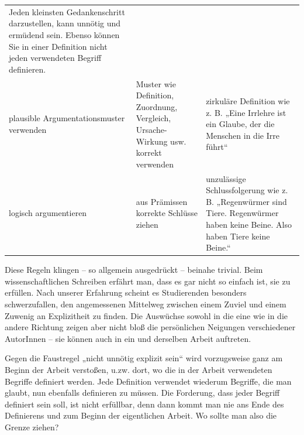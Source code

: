 \documentclass[]{book}
\theoremstyle{definition}
\theoremstyle{definition}
\theoremstyle{definition}
\theoremstyle{remark}
\begin{document}
\begin{longtable}[]{@{}lll@{}}
\begin{minipage}[t]{0.33\columnwidth}
Jeden kleinsten Gedankenschritt darzustellen, kann unnötig und ermüdend
sein. Ebenso können Sie in einer Definition nicht jeden verwendeten
Begriff definieren. \vspace{-6mm}\strut
\end{minipage}\tabularnewline
\begin{minipage}[t]{0.19\columnwidth}\raggedright\strut
plausible Argumentationsmuster verwenden\strut
\end{minipage} & \begin{minipage}[t]{0.39\columnwidth}\raggedright\strut
Muster wie Definition, Zuordnung, Vergleich, Ursache-Wirkung usw.
korrekt verwenden\strut
\end{minipage} & \begin{minipage}[t]{0.33\columnwidth}\raggedright\strut
zirkuläre Definition wie z. B. „Eine Irrlehre ist ein Glaube, der die
Menschen in die Irre führt`` \vspace{-6mm}\strut
\end{minipage}\tabularnewline
\begin{minipage}[t]{0.19\columnwidth}\raggedright\strut
logisch argumentieren\strut
\end{minipage} & \begin{minipage}[t]{0.39\columnwidth}\raggedright\strut
aus Prämissen korrekte Schlüsse ziehen\strut
\end{minipage} & \begin{minipage}[t]{0.33\columnwidth}\raggedright\strut
unzulässige Schlussfolgerung wie z. B. „Regenwürmer sind Tiere.
Regenwürmer haben keine Beine. Also haben Tiere keine Beine.``
\vspace{-6mm}\strut
\end{minipage}\tabularnewline
\bottomrule
\end{longtable}

Diese Regeln klingen -- so allgemein ausgedrückt -- beinahe trivial.
Beim wissenschaftlichen Schreiben erfährt man, dass es gar nicht so
einfach ist, sie zu erfüllen. Nach unserer Erfahrung scheint es
Studierenden besonders schwerzufallen, den angemessenen Mittelweg
zwischen einem Zuviel und einem Zuwenig an Explizitheit zu finden. Die
Auswüchse sowohl in die eine wie in die andere Richtung zeigen aber
nicht bloß die persönlichen Neigungen verschiedener AutorInnen -- sie
können auch in ein und derselben Arbeit auftreten.

Gegen die Faustregel „nicht unnötig explizit sein`` wird vorzugsweise
ganz am Beginn der Arbeit verstoßen, u.zw. dort, wo die in der Arbeit
verwendeten Begriffe definiert werden. Jede Definition verwendet
wiederum Begriffe, die man glaubt, nun ebenfalls definieren zu müssen.
Die Forderung, dass jeder Begriff definiert sein soll, ist nicht
erfüllbar, denn dann kommt man nie ans Ende des Definierens und zum
Beginn der eigentlichen Arbeit. Wo sollte man also die Grenze ziehen?
\end{document}
